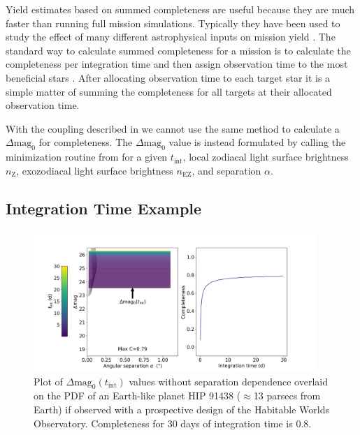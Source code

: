 Yield estimates based on summed completeness are useful because they are much
faster than running full mission simulations. Typically they have been used to
study the effect of many different astrophysical inputs on mission yield
\citep{starkMaximizingExoEarthCandidate2014, Stark2016,
starkExoEarthYieldLandscape2019}. The standard way to calculate summed
completeness for a mission is to calculate the completeness per integration
time and then assign observation time to the most beneficial stars
\citep{hunyadiSingleVisitCompleteness2005,
starkMaximizingExoEarthCandidate2014}. After allocating observation time to
each target star it is a simple matter of summing the completeness for all
targets at their allocated observation time.


With the coupling described in  we cannot use the same
method to calculate a $\Delta\textrm{mag}_0$ for completeness. The
$\Delta\textrm{mag}_0$ value is instead formulated by calling the minimization
routine from  for a given $t_\textrm{int}$, local zodiacal
light surface brightness $n_\textrm{Z}$, exozodiacal light surface brightness
$n_\textrm{EZ}$, and separation $\alpha$.

\subsection{Integration Time Example}
\label{sub:comp_per_inttime}

\begin{figure}
  \begin{center}
    \includegraphics[width=0.95\textwidth]{ch3/figures/default_dmag_curve.png}
  \end{center}
  \caption{Plot of $\Delta\textrm{mag}_0(t_\textrm{int})$ values without separation dependence
  overlaid on the PDF of an Earth-like planet HIP 91438 ($\approx$13 parsecs from Earth)
  if observed with a prospective design of the Habitable Worlds Observatory.
  Completeness for 30 days of integration time is 0.8.}
  \label{fig:default_dmag_curve}
\end{figure}

